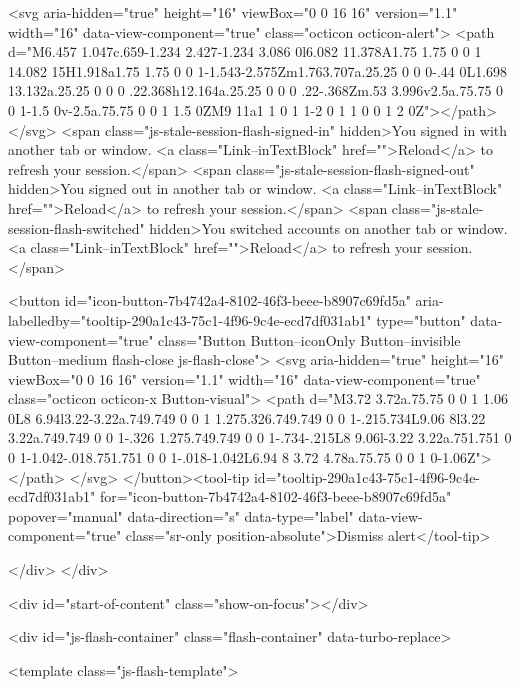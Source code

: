         <svg aria-hidden="true" height="16" viewBox="0 0 16 16" version="1.1" width="16" data-view-component="true" class="octicon octicon-alert">
    <path d="M6.457 1.047c.659-1.234 2.427-1.234 3.086 0l6.082 11.378A1.75 1.75 0 0 1 14.082 15H1.918a1.75 1.75 0 0 1-1.543-2.575Zm1.763.707a.25.25 0 0 0-.44 0L1.698 13.132a.25.25 0 0 0 .22.368h12.164a.25.25 0 0 0 .22-.368Zm.53 3.996v2.5a.75.75 0 0 1-1.5 0v-2.5a.75.75 0 0 1 1.5 0ZM9 11a1 1 0 1 1-2 0 1 1 0 0 1 2 0Z"></path>
</svg>
        <span class="js-stale-session-flash-signed-in" hidden>You signed in with another tab or window. <a class="Link--inTextBlock" href="">Reload</a> to refresh your session.</span>
        <span class="js-stale-session-flash-signed-out" hidden>You signed out in another tab or window. <a class="Link--inTextBlock" href="">Reload</a> to refresh your session.</span>
        <span class="js-stale-session-flash-switched" hidden>You switched accounts on another tab or window. <a class="Link--inTextBlock" href="">Reload</a> to refresh your session.</span>

    <button id="icon-button-7b4742a4-8102-46f3-beee-b8907c69fd5a" aria-labelledby="tooltip-290a1c43-75c1-4f96-9c4e-ecd7df031ab1" type="button" data-view-component="true" class="Button Button--iconOnly Button--invisible Button--medium flash-close js-flash-close">  <svg aria-hidden="true" height="16" viewBox="0 0 16 16" version="1.1" width="16" data-view-component="true" class="octicon octicon-x Button-visual">
    <path d="M3.72 3.72a.75.75 0 0 1 1.06 0L8 6.94l3.22-3.22a.749.749 0 0 1 1.275.326.749.749 0 0 1-.215.734L9.06 8l3.22 3.22a.749.749 0 0 1-.326 1.275.749.749 0 0 1-.734-.215L8 9.06l-3.22 3.22a.751.751 0 0 1-1.042-.018.751.751 0 0 1-.018-1.042L6.94 8 3.72 4.78a.75.75 0 0 1 0-1.06Z"></path>
</svg>
</button><tool-tip id="tooltip-290a1c43-75c1-4f96-9c4e-ecd7df031ab1" for="icon-button-7b4742a4-8102-46f3-beee-b8907c69fd5a" popover="manual" data-direction="s" data-type="label" data-view-component="true" class="sr-only position-absolute">Dismiss alert</tool-tip>


  
</div>
    </div>

  <div id="start-of-content" class="show-on-focus"></div>








    <div id="js-flash-container" class="flash-container" data-turbo-replace>




  <template class="js-flash-template">
    
